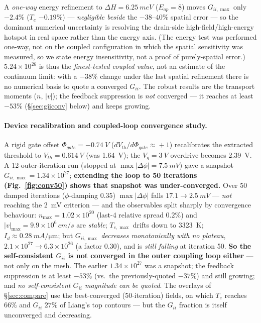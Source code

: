 \documentclass[11pt]{article}
\begin{document}
A \emph{one-way} energy refinement to $\Delta H=\SI{6.25}{meV}$ ($E_{op}=8$) moves $G_{ii,\max}$
only $-2.4\%$ ($T_e$ $-0.19\%$) --- \emph{negligible beside} the $-38$--$40\%$ spatial error --- so
the dominant numerical uncertainty is resolving the drain-side high-field/high-energy hotspot in
real space rather than the energy axis. (The energy test was performed one-way, not on the coupled
configuration in which the spatial sensitivity was measured, so we state energy insensitivity, not
a proof of purely-spatial error.) $5.24\times10^{26}$ is thus the \emph{finest-tested coupled
value}, not an estimate of the continuum limit: with a $-38\%$ change under the last spatial
refinement there is no numerical basis to quote a converged $G_{ii}$. The robust results are the
transport moments ($n$, $|v|$); the feedback suppression is \emph{not} converged --- it reaches at
least $-53\%$ (\S\ref{sec:giiconv} below) and keeps growing.

\paragraph{Device recalibration and coupled-loop convergence study.} A rigid gate offset
$\Phi_{gate}=\SI{-0.74}{V}$ ($dV_{th}/d\Phi_{gate}\!\approx\!+1$) recalibrates the extracted
threshold to $V_{th}=\SI{0.614}{V}$ (was \SI{1.64}{V}); the $V_g=\SI{3}{V}$ overdrive becomes
\SI{2.39}{V}. A 12-outer-iteration run (stopped at $\max|\Delta\phi|=\SI{7.5}{mV}$) gave a snapshot
$G_{ii,\max}=1.34\times10^{27}$; \textbf{extending the loop to 50 iterations
(Fig.~\ref{fig:conv50}) shows that snapshot was under-converged.} Over 50 damped iterations
($\phi$-damping $0.35$) $\max|\Delta\phi|$ falls $17.1\to\SI{2.5}{mV}$ --- \emph{not} reaching the
\SI{2}{mV} criterion --- and the observables split sharply by convergence behaviour:
$n_{\max}=1.02\times10^{20}$ (last-4 relative spread $0.2\%$) and $|v|_{\max}=9.9\times10^{6}\,
\si{cm/s}$ are \emph{stable}; $T_{e,\max}$ drifts down to \SI{3323}{K}; $I_d\approx
\SI{0.28}{mA/\micro\meter}$; but $G_{ii,\max}$ \emph{decreases monotonically with no plateau},
$2.1\times10^{27}\to6.3\times10^{26}$ (a factor $0.30$), and is \emph{still falling} at iteration 50.
\textbf{So the self-consistent $G_{ii}$ is not converged in the outer coupling loop either} --- not
only on the mesh. The earlier $1.34\times10^{27}$ was a snapshot; the feedback suppression is at
least $-53\%$ (vs.\ the previously-quoted $-37\%$) and still growing; and \emph{no self-consistent
$G_{ii}$ magnitude can be quoted}. The overlays of \S\ref{sec:compare} use the best-converged
(50-iteration) fields, on which $T_e$ reaches $66\%$ and $G_{ii}$ $27\%$ of Liang's top contours ---
but the $G_{ii}$ fraction is itself unconverged and decreasing.
\end{document}
